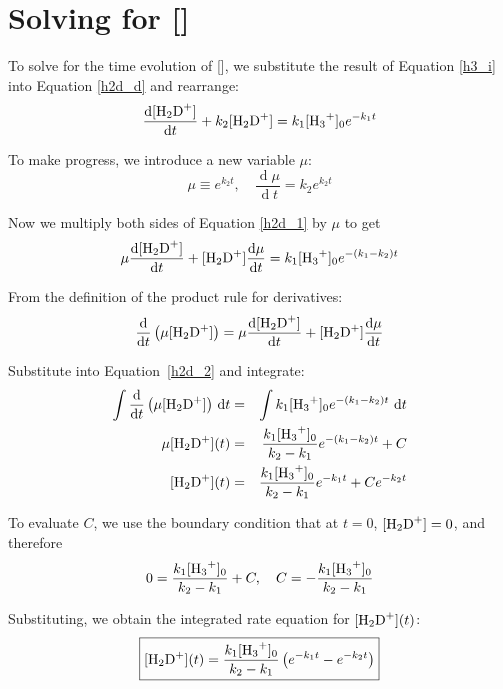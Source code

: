 \documentclass[10pt]{article}
\renewcommand{\d}[1]{\ensuremath{\operatorname{d}\!{#1}}}
\begin{document}
\section*{Solving for []}

To solve for the time evolution of [], we substitute the result of Equation \eqref{h3_i} into Equation \eqref{h2d_d} and rearrange:
\begin{equation}
 \frac{\d{[\ce{H2D+}]}}{\d{t}} + k_2[\ce{H2D+}] = k_1[\ce{H3+}]_0 e^{-k_1 t} \label{h2d_1}
\end{equation}

To make progress, we introduce a new variable $\mu$:
\begin{equation}
 \mu \equiv e^{k_2 t},\quad \frac{\d{\mu}}{\d{t}} = k_2e^{k_2 t}
\end{equation}

Now we multiply both sides of Equation \eqref{h2d_1} by $\mu$ to get
\begin{equation}
 \mu\frac{\d{[\ce{H2D+}]}}{\d{t}} + [\ce{H2D+}]\frac{\d{\mu}}{\d{t}} = k_1[\ce{H3+}]_0 e^{-(k_1-k_2)t} \label{h2d_2}
\end{equation}

From the definition of the product rule for derivatives:
\begin{equation}
 \frac{\d{}}{\d{t}}\left(\mu[\ce{H2D+}]\right) = \mu\frac{\d{[\ce{H2D+}]}}{\d{t}} + [\ce{H2D+}]\frac{\d{\mu}}{\d{t}}
\end{equation}

Substitute into Equation~\eqref{h2d_2} and integrate:
\begin{eqnarray}
 \int \frac{\d{}}{\d{t}}\left(\mu[\ce{H2D+}]\right)\,\d{t} & = & \int k_1[\ce{H3+}]_0 e^{-(k_1-k_2)t}\,\d{t} \nonumber \\
 \mu[\ce{H2D+}](t) & = & \frac{k_1[\ce{H3+}]_0}{k_2 - k_1}e^{-(k_1-k_2)t} + C \nonumber \\
 {[\ce{H2D+}](t)} & = & \frac{k_1[\ce{H3+}]_0}{k_2 - k_1}e^{-k_1 t} + Ce^{-k_2 t}
\end{eqnarray}

To evaluate $C$, we use the boundary condition that at $t=0$, $[\ce{H2D+}] = 0$, and therefore
\begin{equation}
 0 = \frac{k_1[\ce{H3+}]_0}{k_2 - k_1} + C, \quad C = -\frac{k_1[\ce{H3+}]_0}{k_2 - k_1}
\end{equation}

Substituting, we obtain the integrated rate equation for $[\ce{H2D+}](t)$:
\begin{equation}
 \boxed{[\ce{H2D+}](t) = \frac{k_1[\ce{H3+}]_0}{k_2 - k_1}\left(e^{-k_1 t} - e^{-k_2 t}\right) \label{h2d_i}}
\end{equation}
\end{document}
